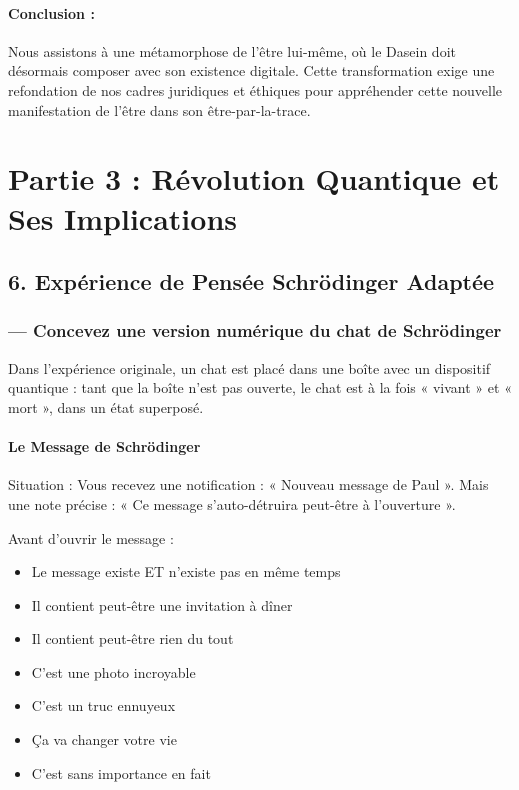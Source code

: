 \documentclass[12pt]{article}
\begin{document}
\paragraph{Conclusion :} Nous assistons à une métamorphose de l'être lui-même, où le Dasein doit désormais composer avec son existence digitale. Cette transformation exige une refondation de nos cadres juridiques et éthiques pour appréhender cette nouvelle manifestation de l'être dans son être-par-la-trace.

\section*{Partie 3 : Révolution Quantique et Ses Implications}

\subsection*{6. Expérience de Pensée Schrödinger Adaptée}

\subsubsection*{— Concevez une version numérique du chat de Schrödinger}

Dans l'expérience originale, un chat est placé dans une boîte avec un dispositif quantique : tant que la boîte n'est pas ouverte, le chat est à la fois « vivant » et « mort », dans un état superposé.

\paragraph{Le Message de Schrödinger}

Situation : Vous recevez une notification : « Nouveau message de Paul ». Mais une note précise : « Ce message s'auto-détruira peut-être à l'ouverture ». 

Avant d'ouvrir le message :
\begin{itemize}
\item Le message existe ET n'existe pas en même temps
\item Il contient peut-être une invitation à dîner
\item Il contient peut-être rien du tout
\item C'est une photo incroyable
\item C'est un truc ennuyeux
\item Ça va changer votre vie
\item C'est sans importance en fait
\end{itemize}
\end{document}
